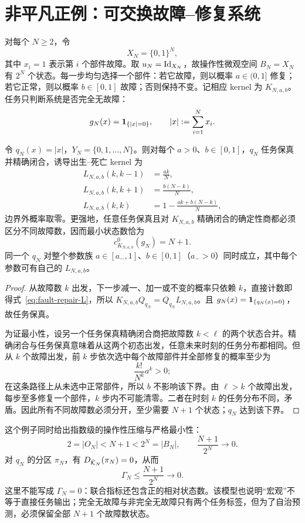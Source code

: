 \section{非平凡正例：可交换故障--修复系统}
\label{sec:fault-repair}

对每个 $N\ge2$，令
\[
X_N=\{0,1\}^N,
\]
其中 $x_i=1$ 表示第 $i$ 个部件故障。取 $u_N=\operatorname{Id}_{X_N}$，故操作性微观空间 $B_N=X_N$ 有 $2^N$ 个状态。每一步均匀选择一个部件：若它故障，则以概率 $a\in(0,1]$ 修复；若它正常，则以概率 $b\in[0,1]$ 故障；否则保持不变。记相应 kernel 为 $K_{N,a,b}$。任务只判断系统是否完全无故障：
\[
g_N(x)=\mathbf 1_{\{|x|=0\}},
\qquad |x|:=\sum_{i=1}^N x_i.
\]

\begin{theorem}[故障数商的精确闭合与最小性]
\label{thm:fault-repair}
令 $q_N(x)=|x|$，$Y_N=\{0,1,\ldots,N\}$。则对每个 $a>0$、$b\in[0,1]$，$q_N$ 任务保真并精确闭合，诱导出生--死亡 kernel 为
\begin{align}
L_{N,a,b}(k,k-1)&=\frac{ak}{N},\nonumber\\
L_{N,a,b}(k,k+1)&=\frac{b(N-k)}{N},\label{eq:fault-repair-L}\\
L_{N,a,b}(k,k)&=1-\frac{ak+b(N-k)}{N},\nonumber
\end{align}
边界外概率取零。更强地，任意任务保真且对 $K_{N,a,b}$ 精确闭合的确定性商都必须区分不同故障数，因而最小状态数恰为
\[
c^0_{K_{N,a,b}}(g_N)=N+1.
\]
同一个 $q_N$ 对整个参数族 $a\in[a_-,1]$、$b\in[0,1]$（$a_->0$）同时成立，其中每个参数可有自己的 $L_{N,a,b}$。
\end{theorem}

\begin{proof}
从故障数 $k$ 出发，下一步减一、加一或不变的概率只依赖 $k$，直接计数即得式~\eqref{eq:fault-repair-L}，所以
$K_{N,a,b}Q_{q_N}=Q_{q_N}L_{N,a,b}$。且 $g_N(x)=\mathbf 1_{\{q_N(x)=0\}}$，故任务保真。

为证最小性，设另一个任务保真精确闭合商把故障数 $k<\ell$ 的两个状态合并。精确闭合与任务保真意味着从这两个初态出发，任意未来时刻的任务分布都相同。但从 $k$ 个故障出发，前 $k$ 步依次选中每个故障部件并全部修复的概率至少为
\[
\frac{k!}{N^k}a^k>0;
\]
在这条路径上从未选中正常部件，所以 $b$ 不影响该下界。由 $\ell>k$ 个故障出发，每步至多修复一个部件，$k$ 步内不可能清零。二者在时刻 $k$ 的任务分布不同，矛盾。因此所有不同故障数必须分开，至少需要 $N+1$ 个状态；$q_N$ 达到该下界。
\end{proof}

这个例子同时给出指数级的操作性压缩与严格最小性：
\[
2=|O_N|<N+1<2^N=|B_N|,
\qquad
\frac{N+1}{2^N}\to0.
\]
对 $q_N$ 的分区 $\pi_N$，有 $D_{\bar{\mathcal K}_N}(\pi_N)=0$，从而
\[
\Gamma_N\le\frac{N+1}{2^N}\to0.
\]
这里不能写成 $\Gamma_N=0$：联合指标还包含正的相对状态数。该模型也说明“宏观”不等于直接任务输出；完全无故障与非完全无故障只有两个任务标签，但为了自治预测，必须保留全部 $N+1$ 个故障数状态。
